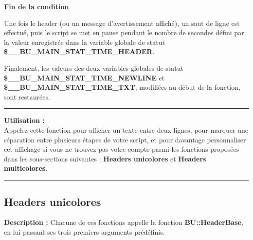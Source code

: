 \documentclass[a4paper,10pt]{article}
\begin{document}
\begin{justify}
    \textbf{\color{brick}Fin de la condition}.
\end{justify}\setlength{\parskip}{2em}


\begin{justify}
    Une fois le header (ou un message d'avertissement affiché), un saut de ligne est effectué, puis le script se met en pause pendant le nombre de secondes défini par la valeur enregistrée dans la variable globale de statut \textbf{\color{orange}\$\_\_BU\_MAIN\_STAT\_TIME\_HEADER}.
\end{justify}\setlength{\parskip}{1em}

\begin{justify}
    Finalement, les valeurs des deux variables globales de statut \textbf{\color{orange}\$\_\_BU\_MAIN\_STAT\_TIME\_NEWLINE} et \textbf{\color{orange}\$\_\_BU\_MAIN\_STAT\_TIME\_TXT}, modifiées au début de la fonction, sont restaurées.
\end{justify}

\par\noindent\rule{\textwidth}{0.4pt}

\begin{justify}
    \textbf{Utilisation :}\\[1\baselineskip]
    Appelez cette fonction pour afficher un texte entre deux lignes, pour marquer une séparation entre plusieurs étapes de votre script, et pour davantage personnaliser cet affichage si vous ne trouvez pas votre compte parmi les fonctions proposées dans les sous-sections suivantes : \textbf{\color{green}Headers unicolores} et \textbf{\color{green}Headers multicolores}.
\end{justify}




\color{green}\par\noindent\rule{\textwidth}{0.4pt}\color{white}

\color{green}
\subsection{Headers unicolores}\color{white}

\begin{justify}
    \textbf{Description :}
    Chacune de ces fonctions appelle la fonction \textbf{\color{mauve}BU::HeaderBase}, en lui passant ses trois premiers arguments prédéfinis.
\end{justify}
\end{document}
